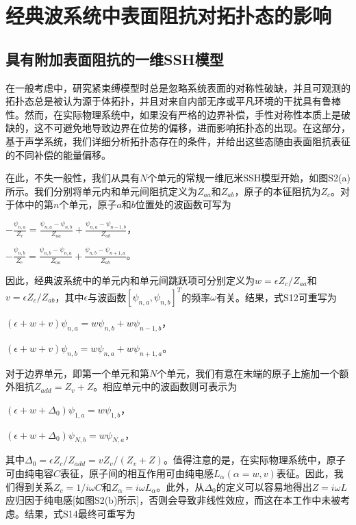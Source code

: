 \section{经典波系统中表面阻抗对拓扑态的影响}
\subsection{具有附加表面阻抗的一维SSH模型}

在一般考虑中，研究紧束缚模型时总是忽略系统表面的对称性破缺，并且可观测的拓扑态总是被认为源于体拓扑，并且对来自内部无序或平凡环境的干扰具有鲁棒性。然而，在实际物理系统中，如果没有严格的边界补偿，手性对称性本质上是破缺的，这不可避免地导致边界在位势的偏移，进而影响拓扑态的出现。在这部分，基于声学系统，我们详细分析拓扑态存在的条件，并给出这些态随由表面阻抗表征的不同补偿的能量偏移。

在此，不失一般性，我们从具有\(N\)个单元的常规一维厄米SSH模型开始，如图S2(a)所示。我们分别将单元内和单元间阻抗定义为\(Z_{aa}\)和\(Z_{ab}\)，原子的本征阻抗为\(Z_{c}\)。对于体中的第\(n\)个单元，原子\(a\)和\(b\)位置处的波函数可写为

\(-\frac{\psi_{n,a}}{Z_{c}}=\frac{\psi_{n,a}-\psi_{n,b}}{Z_{aa}}+\frac{\psi_{n,a}-\psi_{n-1,b}}{Z_{ab}}\)，

\(-\frac{\psi_{n,b}}{Z_{c}}=\frac{\psi_{n,b}-\psi_{n,a}}{Z_{aa}}+\frac{\psi_{n,b}-\psi_{n+1,a}}{Z_{ab}}\)。

因此，经典波系统中的单元内和单元间跳跃项可分别定义为\(w = \epsilon Z_{c} / Z_{aa}\)和\(v = \epsilon Z_{c} / Z_{ab}\)，其中\(\epsilon\)与波函数\([\psi_{n,a},\psi_{n,b}]^T\)的频率\(\omega\)有关。结果，式S12可重写为

\((\epsilon + w + v)\psi_{n,a} = w\psi_{n,b} + w\psi_{n - 1,b}\)，

\((\epsilon + w + v)\psi_{n,b} = w\psi_{n,a} + w\psi_{n + 1,a}\)。

对于边界单元，即第一个单元和第\(N\)个单元，我们有意在末端的原子上施加一个额外阻抗\(Z_{add}=Z_{v}+Z\)。相应单元中的波函数则可表示为

\((\epsilon + w + \Delta_0)\psi_{1,a} = w\psi_{1,b}\)，

\((\epsilon + w + \Delta_0)\psi_{N,b} = w\psi_{N,a}\)，

其中\(\Delta_0 = \epsilon Z_{c} / Z_{add} = vZ_{v} / (Z_{v} + Z)\)。值得注意的是，在实际物理系统中，原子可由纯电容\(C\)表征，原子间的相互作用可由纯电感\(L_{\alpha}(\alpha = w,v)\)表征。因此，我们得到关系\(Z_{c} = 1 / i\omega C\)和\(Z_{\alpha} = i\omega L_{\alpha}\)。此外，从\(\Delta_0\)的定义可以容易地得出\(Z = i\omega L\)应归因于纯电感[如图S2(b)所示]，否则会导致非线性效应，而这在本工作中未被考虑。结果，式S14最终可重写为

